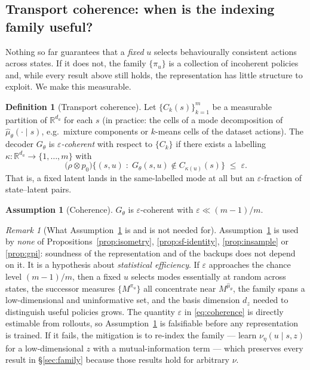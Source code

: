 \documentclass[11pt]{article}
\theoremstyle{plain}
\theoremstyle{definition}
\newtheorem{definition}[lemma]{Definition}
\newtheorem{assumption}{Assumption}
\theoremstyle{remark}
\newtheorem{remark}[lemma]{Remark}
\newcommand{\R}{\mathbb R}
\newcommand{\1}{\mathbf 1}
\newcommand{\Gth}{G_\theta}
\newcommand{\muhat}{\hat\mu_\theta}
\begin{document}
\subsection{Transport coherence: when is the indexing family useful?}

Nothing so far guarantees that a \emph{fixed} $u$ selects behaviourally consistent actions
across states. If it does not, the family $\{\pi_u\}$ is a collection of incoherent
policies and, while every result above still holds, the representation has little
structure to exploit. We make this measurable.

\begin{definition}[Transport coherence]
\label{def:coherence}
Let $\{C_k(s)\}_{k=1}^m$ be a measurable partition of $\R^{d_a}$ for each $s$ (in practice:
the cells of a mode decomposition of $\muhat(\cdot\mid s)$, e.g.\ mixture components or
$k$-means cells of the dataset actions). The decoder $\Gth$ is \emph{$\varepsilon$-coherent}
with respect to $\{C_k\}$ if there exists a labelling $\kappa:\R^{d_a}\to\{1,\dots,m\}$
with
\begin{equation}
\label{eq:coherence}
  \big(\rho\otimes p_0\big)\Big\{(s,u)\;:\;\Gth(s,u)\notin C_{\kappa(u)}(s)\Big\}\;\le\;\varepsilon .
\end{equation}
That is, a fixed latent lands in the same-labelled mode at all but an $\varepsilon$-fraction
of state--latent pairs.
\end{definition}

\begin{assumption}[Coherence]
\label{ass:coherence}
$\Gth$ is $\varepsilon$-coherent with $\varepsilon\ll (m-1)/m$.
\end{assumption}

\begin{remark}[What Assumption~\ref{ass:coherence} is and is not needed for]
\label{rem:coherence-role}
Assumption~\ref{ass:coherence} is used by \emph{none} of
Propositions~\ref{prop:isometry}, \ref{prop:sf-identity}, \ref{prop:insample} or
\ref{prop:gpi}: soundness of the representation and of the backups does not depend on it.
It is a hypothesis about \emph{statistical efficiency}. If $\varepsilon$ approaches the
chance level $(m-1)/m$, then a fixed $u$ selects modes essentially at random across states,
the successor measures $\{M^{\pi_u}\}$ all concentrate near $M^{\muhat}$, the family spans
a low-dimensional and uninformative set, and the basis dimension $d_z$ needed to
distinguish useful policies grows. The quantity $\varepsilon$ in \eqref{eq:coherence} is
directly estimable from rollouts, so Assumption~\ref{ass:coherence} is falsifiable
before any representation is trained. If it fails, the mitigation is to
re-index the family --- learn $\nu_\eta(u\mid s,z)$ for a low-dimensional $z$ with a
mutual-information term --- which preserves every result in
\S\ref{sec:family} because those results hold for arbitrary $\nu$.
\end{remark}
\end{document}
